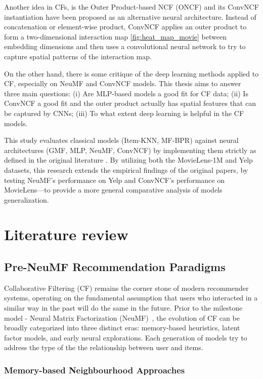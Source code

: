 \documentclass[11pt]{article}
\begin{document}
Another idea in CFs, is the Outer Product-based NCF (ONCF) and its ConvNCF instantiation have been proposed as an alternative neural architecture. Instead of concatenation or element-wise product, ConvNCF applies an outer product to form a two-dimensional interaction map \ref{fig:heat_map_movie} between embedding dimensions and then uses a convolutional neural network to try to capture spatial patterns of the interaction map.

On the other hand, there is some critique of the deep learning methods applied to CF, especially on NeuMF and ConvNCF models. This thesis aims to answer three main questions: (i) Are MLP-based models a good fit for CF data; (ii) Is ConvNCF a good fit and the outer product actually has spatial features that can be captured by CNNs; (iii) To what extent deep learning is helpful in the CF models.

This study evaluates classical models (Item-KNN, MF-BPR) against neural architectures (GMF, MLP, NeuMF, ConvNCF) by implementing them strictly as defined in the original literature \cite{he2017neural, he2018convncf}. By utilizing both the MovieLens-1M and Yelp datasets, this research extends the empirical findings of the original papers, by testing NeuMF’s performance on Yelp and ConvNCF’s performance on MovieLens—to provide a more general comparative analysis of models generalization.



\section{Literature review}
\subsection{Pre-NeuMF Recommendation Paradigms}
\label{sec:pre-neumf}
Collaborative Filtering (CF) remains the corner stone of modern recommender systems, operating on the fundamental assumption that users who interacted in a similar way in the past will do the same in the future. Prior to the milestone model -  Neural Matrix Factorization (NeuMF)~\cite{he2017neural}, the evolution of CF can be broadly categorized into three distinct eras: memory-based heuristics, latent factor models, and early neural explorations. Each generation of models try to address the type of the the relationship between user and items.  

\subsubsection{Memory-based Neighbourhood Approaches}
\end{document}
